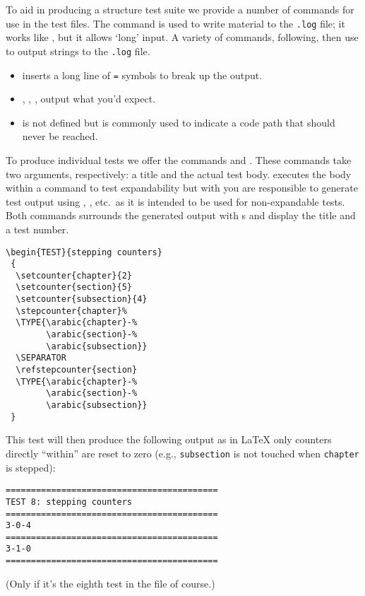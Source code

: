 \documentclass[a4paper]{ltugboat}
\begin{document}
To aid in producing a structure test suite we provide a number of
commands for use in the test files.  The  command is used to write
material to the \texttt{.log} file; it works like , but it
allows `long' input.
%
A variety of commands, following, then use  to output strings
to the \texttt{.log} file.
\begin{itemize}
\item
{} inserts a long line of \texttt{=} symbols to break up
the output.
\item
{}, , ,  output what you'd expect.
\item
{} is not defined but is commonly used to indicate a code path
that should never be reached.
\end{itemize}
To produce individual tests we offer the commands  and
. These commands take two arguments, respectively: a title
and the actual test body.   executes the body within a
 command to test expandability but with  you are
responsible to generate test output using , ,
etc.\ as it is intended to be used for non-expandable tests.
Both  commands  surrounds the generated output with s and 
display the title and a test number.
\begin{Verbatim}
\begin{TEST}{stepping counters}
 {
  \setcounter{chapter}{2}
  \setcounter{section}{5}
  \setcounter{subsection}{4}
  \stepcounter{chapter}%
  \TYPE{\arabic{chapter}-%
        \arabic{section}-%
        \arabic{subsection}}
  \SEPARATOR
  \refstepcounter{section}
  \TYPE{\arabic{chapter}-%
        \arabic{section}-%
        \arabic{subsection}}
 }
\end{Verbatim}
This test will then produce the following output as in \LaTeX{} only
counters directly ``within'' are reset to zero (e.g.,
\texttt{subsection} is not touched when \texttt{chapter} is stepped):
\begin{Verbatim}
==========================================
TEST 8: stepping counters
==========================================
3-0-4
==========================================
3-1-0
==========================================
\end{Verbatim}
(Only if it's the eighth test in the file of course.)



\end{document}
